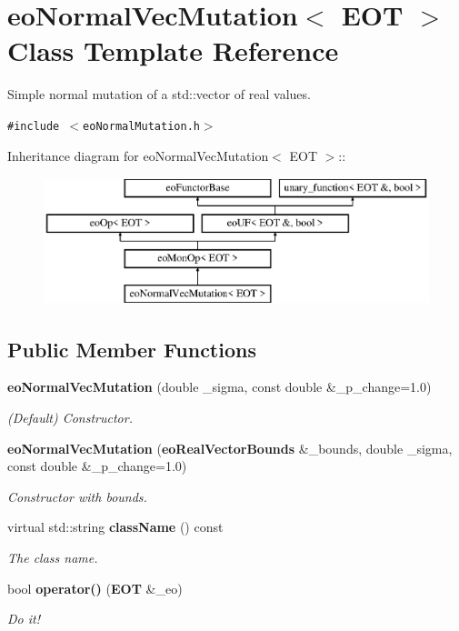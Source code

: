 \section{eo\-Normal\-Vec\-Mutation$<$ EOT $>$ Class Template Reference}
\label{classeo_normal_vec_mutation}
Simple normal mutation of a std::vector of real values.  


{\tt \#include $<$eo\-Normal\-Mutation.h$>$}

Inheritance diagram for eo\-Normal\-Vec\-Mutation$<$ EOT $>$::\begin{figure}[H]
\begin{center}
\leavevmode
\includegraphics[height=3.71476cm]{classeo_normal_vec_mutation}
\end{center}
\end{figure}
\subsection*{Public Member Functions}
\begin{CompactItemize}
\item 
{\bf eo\-Normal\-Vec\-Mutation} (double \_\-sigma, const double \&\_\-p\_\-change=1.0)
\begin{CompactList}\small\item\em (Default) Constructor. \item\end{CompactList}\item 
{\bf eo\-Normal\-Vec\-Mutation} ({\bf eo\-Real\-Vector\-Bounds} \&\_\-bounds, double \_\-sigma, const double \&\_\-p\_\-change=1.0)
\begin{CompactList}\small\item\em Constructor with bounds. \item\end{CompactList}\item 
virtual std::string {\bf class\-Name} () const \label{classeo_normal_vec_mutation_a2}

\begin{CompactList}\small\item\em The class name. \item\end{CompactList}\item 
bool {\bf operator()} ({\bf EOT} \&\_\-eo)
\begin{CompactList}\small\item\em Do it! \item\end{CompactList}\end{CompactItemize}

